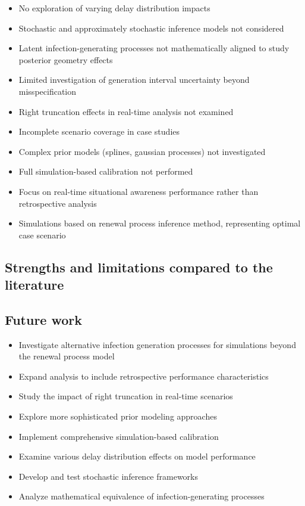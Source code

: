 \documentclass{getwriting}
\begin{document}
\begin{itemize}
    \item No exploration of varying delay distribution impacts
    \item Stochastic and approximately stochastic inference models not considered
    \item Latent infection-generating processes not mathematically aligned to study posterior geometry effects
    \item Limited investigation of generation interval uncertainty beyond misspecification
    \item Right truncation effects in real-time analysis not examined
    \item Incomplete scenario coverage in case studies
    \item Complex prior models (splines, gaussian processes) not investigated
    \item Full simulation-based calibration not performed
    \item Focus on real-time situational awareness performance rather than retrospective analysis
    \item Simulations based on renewal process inference method, representing optimal case scenario
\end{itemize}

\subsection{Strengths and limitations compared to the literature}

\subsection{Future work}

\begin{itemize}
    \item Investigate alternative infection generation processes for simulations beyond the renewal process model
    \item Expand analysis to include retrospective performance characteristics
    \item Study the impact of right truncation in real-time scenarios
    \item Explore more sophisticated prior modeling approaches
    \item Implement comprehensive simulation-based calibration
    \item Examine various delay distribution effects on model performance
    \item Develop and test stochastic inference frameworks
    \item Analyze mathematical equivalence of infection-generating processes
\end{itemize}
\end{document}

